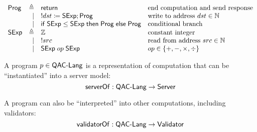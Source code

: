 \[\begin{array}{lrll}
\Prog&\triangleq&\Return&\text{end computation and send response}\\
&\mid&!dst\coloneqq\Sexp;\Prog&\text{write to address }dst\in\Nat\\\null
&\mid&\If\Sexp\le\Sexp\Then\Prog\Else\Prog&\text{conditional branch}\\
\Sexp&\triangleq&\Int&\text{constant integer}\\
&\mid&!src&\text{read from address }src\in\Nat\\
&\mid&\Sexp\oop\Sexp&op\in\{+,-,\times,\div\}
\end{array}
\]

\begin{definition}
  A program $p\in\textsf{QAC-Lang}$ is a representation of computation that can be
  ``instantiated'' into a server model:
  \[\mathsf{serverOf}:\textsf{QAC-Lang}\to\mathsf{Server}\]
  
  A program can also be ``interpreted'' into other computations, including
  validators:
  \[\mathsf{validatorOf}:\textsf{QAC-Lang}\to\mathsf{Validator}\]
\end{definition}

